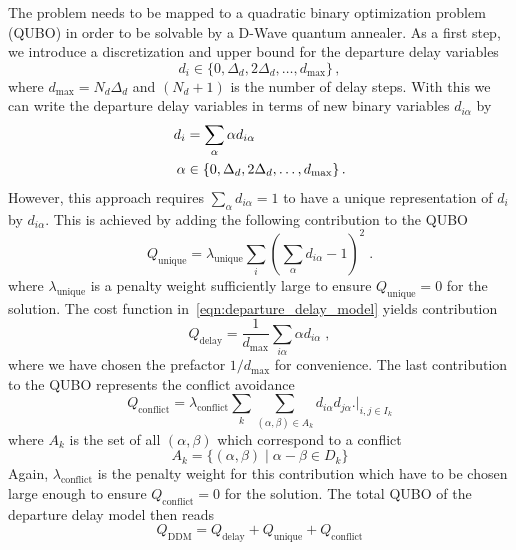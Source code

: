 The problem needs to be mapped to a quadratic binary optimization problem (QUBO) in order to be solvable by a D-Wave quantum annealer.
As a first step, we introduce a discretization and upper bound for the departure delay variables 
\begin{equation*}
    d_i \in \{0, \Delta_d, 2\Delta_d, \dots, d_\text{max} \}\, ,
\end{equation*}
where $d_\text{max} = N_d \Delta_d$ and $(N_d + 1)$ is the number of delay steps.
With this we can write the departure delay variables in terms of new binary variables $d_{i\alpha}$ by
\begin{align}
    d_i & = \sum_\alpha \alpha d_{i\alpha} \notag \\
    \alpha & \in \{0, \Delta_d, 2\Delta_d, \dots, d_\text{max} \}\, . \label{eqn:departure_delay_model_discretization}
\end{align}
However, this approach requires $\sum_\alpha d_{i\alpha} = 1$ to have a unique representation of $d_i$ by $d_{i\alpha}$.
This is achieved by adding the following contribution to the QUBO
\begin{equation}
    \label{eqn:departure_delay_model_qubo_unique}
    Q_\text{unique} = \lambda_\text{unique} \sum_i {\left( \sum_\alpha d_{i\alpha} - 1 \right)}^2 \; .
\end{equation}
where $\lambda_\text{unique}$ is a penalty weight sufficiently large to ensure $Q_\text{unique}=0$ for the solution.
The cost function in~\eqref{eqn:departure_delay_model} yields contribution
\begin{equation}
    \label{eqn:departure_delay_model_qubo_departure}
    Q_\text{delay} = \frac{1}{d_\text{max}}\sum_{i\alpha} \alpha d_{i\alpha} \; ,
\end{equation}
where we have chosen the prefactor $1/d_\text{max}$ for convenience.
The last contribution to the QUBO represents the conflict avoidance
\begin{equation}
    \label{eqn:departure_delay_model_qubo_conflict}
    Q_\text{conflict} = \lambda_\text{conflict} \sum_k \sum_{(\alpha, \beta) \in A_k} d_{i\alpha} d_{j\alpha} \biggl. \biggr|_{i, j \in I_k}
\end{equation}
where $A_k$ is the set of all $(\alpha, \beta)$ which correspond to a conflict
\begin{equation*}
    A_k = \{(\alpha, \beta) \; | \; \alpha - \beta \in D_k\}
\end{equation*}
Again, $\lambda_\text{conflict}$ is the penalty weight for this contribution which have to be chosen large enough to ensure $Q_\text{conflict}=0$ for the solution.
The total QUBO of the departure delay model then reads
\begin{equation*}
    Q_\text{DDM} = Q_\text{delay} + Q_\text{unique} + Q_\text{conflict}
\end{equation*}


